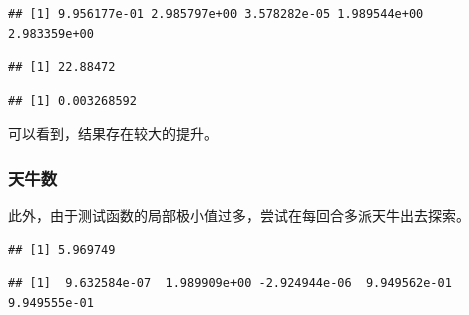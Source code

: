 \documentclass[]{ctexbook}
\newenvironment{Shaded}{\begin{snugshade}}{\end{snugshade}}
\newcommand{\KeywordTok}[1]{\textcolor[rgb]{0.13,0.29,0.53}{\textbf{#1}}}
\newcommand{\DataTypeTok}[1]{\textcolor[rgb]{0.13,0.29,0.53}{#1}}
\newcommand{\DecValTok}[1]{\textcolor[rgb]{0.00,0.00,0.81}{#1}}
\newcommand{\FloatTok}[1]{\textcolor[rgb]{0.00,0.00,0.81}{#1}}
\newcommand{\StringTok}[1]{\textcolor[rgb]{0.31,0.60,0.02}{#1}}
\newcommand{\OperatorTok}[1]{\textcolor[rgb]{0.81,0.36,0.00}{\textbf{#1}}}
\newcommand{\NormalTok}[1]{#1}
\begin{document}
\begin{verbatim}
## [1] 9.956177e-01 2.985797e+00 3.578282e-05 1.989544e+00 2.983359e+00
\end{verbatim}

\begin{verbatim}
## [1] 22.88472
\end{verbatim}

\begin{verbatim}
## [1] 0.003268592
\end{verbatim}

可以看到，结果存在较大的提升。

\subsubsection{天牛数}

此外，由于测试函数的局部极小值过多，尝试在每回合多派天牛出去探索。

\begin{Shaded}
\end{Shaded}

\begin{verbatim}
## [1] 5.969749
\end{verbatim}

\begin{verbatim}
## [1]  9.632584e-07  1.989909e+00 -2.924944e-06  9.949562e-01  9.949555e-01
\end{verbatim}
\end{document}
